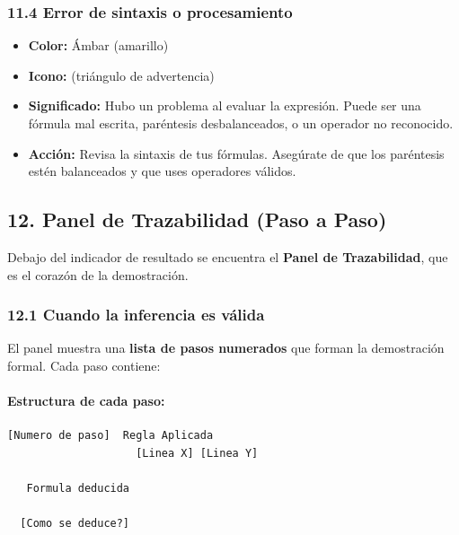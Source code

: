 \documentclass[11pt,a4paper]{article}
\begin{document}
\subsubsection{11.4 Error de sintaxis o procesamiento}

\begin{itemize}[leftmargin=*]
\item \textbf{Color:} Ámbar (amarillo)
\item \textbf{Icono:}  (triángulo de advertencia)
\item \textbf{Significado:} Hubo un problema al evaluar la expresión. Puede ser una fórmula mal escrita, paréntesis desbalanceados, o un operador no reconocido.
\item \textbf{Acción:} Revisa la sintaxis de tus fórmulas. Asegúrate de que los paréntesis estén balanceados y que uses operadores válidos.
\end{itemize}

\hrulefill

\subsection{12. Panel de Trazabilidad (Paso a Paso)}

Debajo del indicador de resultado se encuentra el \textbf{Panel de Trazabilidad}, que es el corazón de la demostración.

\subsubsection{12.1 Cuando la inferencia es válida}

El panel muestra una \textbf{lista de pasos numerados} que forman la demostración formal. Cada paso contiene:

\paragraph{Estructura de cada paso:}

\begin{lstlisting}[language={},basicstyle=\ttfamily\scriptsize]
  [Numero de paso]  Regla Aplicada           
                    [Linea X] [Linea Y]      
                                             
   Formula deducida                         
                                             
  [Como se deduce?]                        
\end{lstlisting}
\end{document}
